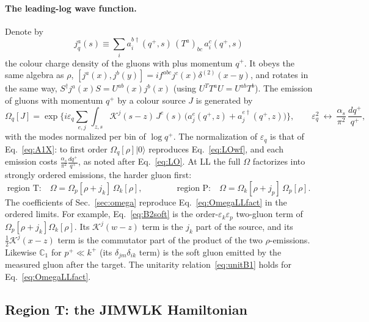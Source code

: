 \documentclass[aps,prd,onecolumn,superscriptaddress,nofootinbib,floatfix,longbibliography,11pt]{revtex4-2}
\numberwithin{equation}{section}
\newcommand{\KK}{\mathcal{K}}
\def\mf#1{\mathbb{#1}}
\begin{document}
\paragraph*{The leading-log wave function.} Denote by
\begin{equation}
j^a_q(s)\equiv\sum_i a^{b\dagger}_i(q^+,s)\,(T^a)_{bc}\,a^c_i(q^+,s)
\label{eq:jdef}
\end{equation}
the colour charge density of the gluons with plus momentum $q^+$. It obeys the same algebra as $\rho$, $[j^a(x),j^b(y)]=if^{abc}j^c(x)\delta^{(2)}(x-y)$, and rotates in the same way, $S^\dagger j^a(x)S=U^{ab}(x)j^b(x)$ (using $U^TT^aU=U^{ab}T^b$). The emission of gluons with momentum $q^+$ by a colour source $J$ is generated by
\begin{equation}
\Omega_q[J]=\exp\Big\{i\varepsilon_q\sum_{e,j}\int_{z,s}\KK^j(s-z)\,J^e(s)\,\big(a^e_j(q^+,z)+a^{e\dagger}_j(q^+,z)\big)\Big\},\qquad \varepsilon_q^2\ \leftrightarrow\ \frac{\alpha_s}{\pi^2}\,\frac{dq^+}{q^+},
\label{eq:OmegaLL}
\end{equation}
with the modes normalized per bin of $\log q^+$. The normalization of $\varepsilon_q$ is that of Eq.~\eqref{eq:A1X}: to first order $\Omega_q[\rho]|0\rangle$ reproduces Eq.~\eqref{eq:LOwf}, and each emission costs $\frac{\alpha_s}{\pi^2}\frac{dq^+}{q^+}$, as noted after Eq.~\eqref{eq:LO}. At LL the full $\Omega$ factorizes into strongly ordered emissions, the harder gluon first:
\begin{equation}
\text{region T:}\quad \Omega=\Omega_p[\rho+j_k]\,\Omega_k[\rho],\qquad\qquad \text{region P:}\quad \Omega=\Omega_k[\rho+j_p]\,\Omega_p[\rho].
\label{eq:OmegaLLfact}
\end{equation}
The coefficients of Sec.~\ref{sec:omega} reproduce Eq.~\eqref{eq:OmegaLLfact} in the ordered limits. For example, Eq.~\eqref{eq:B2soft} is the order-$\varepsilon_k\varepsilon_p$ two-gluon term of $\Omega_p[\rho+j_k]\Omega_k[\rho]$. Its $\KK^j(w-z)$ term is the $j_k$ part of the source, and its $\frac12\KK^j(x-z)$ term is the commutator part of the product of the two $\rho$-emissions. Likewise $\mf C_1$ for $p^+\ll k^+$ (its $\delta_{jm}\delta_{ik}$ term) is the soft gluon emitted by the measured gluon after the target. The unitarity relation~\eqref{eq:unitB1} holds for Eq.~\eqref{eq:OmegaLLfact}.

\subsection{Region T: the JIMWLK Hamiltonian}\label{sec:T}
\end{document}
